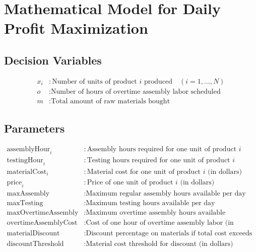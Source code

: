 \documentclass{article}
\begin{document}
\section*{Mathematical Model for Daily Profit Maximization}

\subsection*{Decision Variables}
\begin{align*}
x_i & : \text{Number of units of product } i \text{ produced} \quad (i = 1, \ldots, N) \\
o & : \text{Number of hours of overtime assembly labor scheduled} \\
m & : \text{Total amount of raw materials bought}
\end{align*}

\subsection*{Parameters}
\begin{align*}
\text{assemblyHour}_i & : \text{Assembly hours required for one unit of product } i \\
\text{testingHour}_i & : \text{Testing hours required for one unit of product } i \\
\text{materialCost}_i & : \text{Material cost for one unit of product } i \text{ (in dollars)} \\
\text{price}_i & : \text{Price of one unit of product } i \text{ (in dollars)} \\
\text{maxAssembly} & : \text{Maximum regular assembly hours available per day} \\
\text{maxTesting} & : \text{Maximum testing hours available per day} \\
\text{maxOvertimeAssembly} & : \text{Maximum overtime assembly hours available} \\
\text{overtimeAssemblyCost} & : \text{Cost of one hour of overtime assembly labor (in dollars)} \\
\text{materialDiscount} & : \text{Discount percentage on materials if total cost exceeds threshold (0 to 100)} \\
\text{discountThreshold} & : \text{Material cost threshold for discount (in dollars)}
\end{align*}
\end{document}
